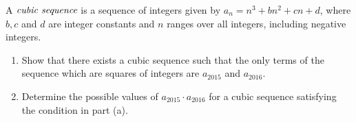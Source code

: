 A $\emph{cubic sequence}$ is a sequence of integers given by $a_n =n^3 + bn^2 + cn + d$, where $b, c$ and $d$ are integer constants and $n$ ranges over all integers, including negative integers.
\begin{enumerate}[label=(\alph*)]
	\item Show that there exists a cubic sequence such that the only terms of the sequence which are squares of integers are $a_{2015}$ and $a_{2016}$.
	\item Determine the possible values of $a_{2015} \cdot a_{2016}$ for a cubic sequence
satisfying the condition in part (a).
\end{enumerate}